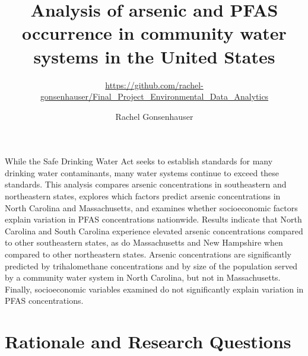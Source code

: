\documentclass[12pt,]{article}
\title{Analysis of arsenic and PFAS occurrence in community water systems in
the United States}
\subtitle{\url{https://github.com/rachel-gonsenhauser/Final_Project_Environmental_Data_Analytics}}
\author{Rachel Gonsenhauser}
\date{}
\begin{document}
\maketitle

\newpage
\abstract

While the Safe Drinking Water Act seeks to establish standards for many
drinking water contaminants, many water systems continue to exceed these
standards. This analysis compares arsenic concentrations in southeastern
and northeastern states, explores which factors predict arsenic
concentrations in North Carolina and Massachusetts, and examines whether
socioeconomic factors explain variation in PFAS concentrations
nationwide. Results indicate that North Carolina and South Carolina
experience elevated arsenic concentrations compared to other
southeastern states, as do Massachusetts and New Hampshire when compared
to other northeastern states. Arsenic concentrations are significantly
predicted by trihalomethane concentrations and by size of the population
served by a community water system in North Carolina, but not in
Massachusetts. Finally, socioeconomic variables examined do not
significantly explain variation in PFAS concentrations.

\newpage
\tableofcontents 
\newpage
\listoftables
\newpage
\listoffigures 
\newpage

\hypertarget{rationale-and-research-questions}{%
\section{Rationale and Research
Questions}\label{rationale-and-research-questions}}
\end{document}
